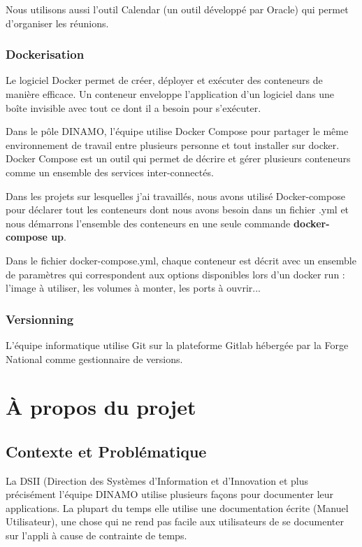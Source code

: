 \documentclass[12pt]{article}
\begin{document}
Nous utilisons aussi l'outil Calendar (un outil développé par Oracle) qui permet d’organiser les réunions.  

\subsubsection{Dockerisation}

Le logiciel Docker permet de créer, déployer et exécuter des conteneurs de manière efficace. Un conteneur enveloppe l’application d’un logiciel dans une boîte invisible avec tout ce dont il a besoin pour s’exécuter.


Dans le pôle DINAMO, l'équipe utilise Docker Compose pour partager le même environnement de travail entre plusieurs personne et tout installer sur docker. Docker Compose est un outil qui permet de décrire et gérer  plusieurs conteneurs comme un ensemble des services inter-connectés.

Dans les projets sur lesquelles j'ai travaillés, nous avons utilisé Docker-compose pour déclarer tout les conteneurs dont nous avons besoin dans un fichier .yml  et nous démarrons l'ensemble des conteneurs en une seule commande \textbf{docker-compose up}. 

Dans le fichier docker-compose.yml, chaque conteneur est décrit avec un ensemble de paramètres qui correspondent aux options disponibles lors d’un docker run : l’image à utiliser, les volumes à monter, les ports à ouvrir...
 

\subsubsection{Versionning}

L'équipe informatique utilise Git sur la plateforme Gitlab hébergée par la Forge National comme gestionnaire de versions. 

\section{À propos du projet}

\subsection{Contexte et Problématique}

La DSII (Direction des Systèmes d'Information et d'Innovation et plus précisément l'équipe DINAMO utilise plusieurs façons pour documenter leur applications. La plupart du temps elle utilise une documentation écrite (Manuel Utilisateur), une chose qui ne rend pas facile aux utilisateurs de se documenter sur l'appli à cause de contrainte de temps. 
\end{document}
